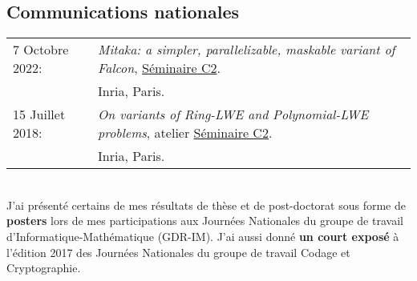 \documentclass[11pt]{article}
\begin{document}
                



\subsection*{Communications nationales}

\hspace{-0.85cm}\begin{tabular}{ll}
                 7 Octobre 2022: & {\em Mitaka: a simpler, parallelizable, maskable variant of Falcon},  \href{https://seminaire-c2.inria.fr/}{Séminaire C2}.\\ & Inria, Paris. \\
                  
                  15 Juillet 2018: & {\em On variants of Ring-LWE and Polynomial-LWE problems}, atelier \href{https://seminaire-c2.inria.fr/}{Séminaire C2}.\\ & Inria, Paris. 
                \end{tabular}\\[5pt]

      
J'ai présenté certains de mes résultats de thèse et de post-doctorat sous forme de \textbf{posters} lors de mes participations aux Journées Nationales du groupe de travail d'Informatique-Mathématique (GDR-IM).
J'ai aussi donné \textbf{un court exposé} à l'édition 2017 des Journées Nationales du groupe de travail Codage et Cryptographie.
\end{document}
